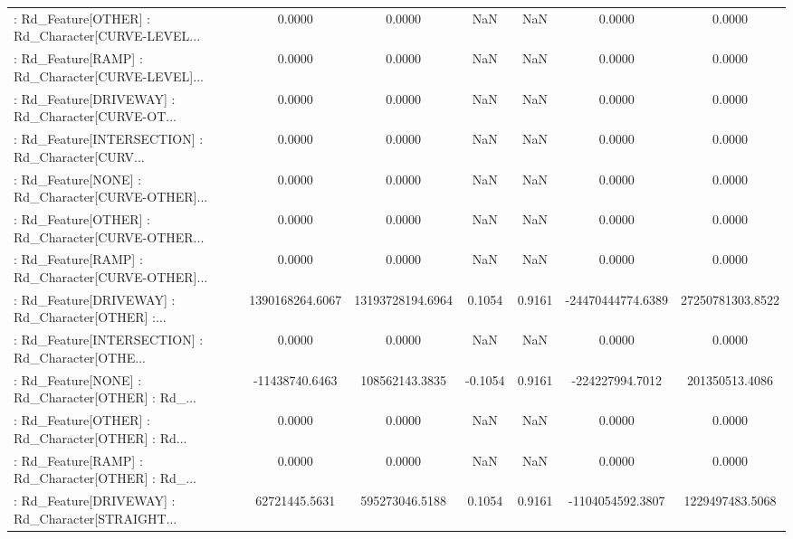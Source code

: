 \begin{longtable}{p{4cm}cccccc}
 : Rd\_Feature[OTHER] : Rd\_Character[CURVE-LEVEL... &            0.0000 &            0.0000 &     NaN &          NaN &             0.0000 &            0.0000 \\
 : Rd\_Feature[RAMP] : Rd\_Character[CURVE-LEVEL]... &            0.0000 &            0.0000 &     NaN &          NaN &             0.0000 &            0.0000 \\
 : Rd\_Feature[DRIVEWAY] : Rd\_Character[CURVE-OT... &            0.0000 &            0.0000 &     NaN &          NaN &             0.0000 &            0.0000 \\
 : Rd\_Feature[INTERSECTION] : Rd\_Character[CURV... &            0.0000 &            0.0000 &     NaN &          NaN &             0.0000 &            0.0000 \\
 : Rd\_Feature[NONE] : Rd\_Character[CURVE-OTHER]... &            0.0000 &            0.0000 &     NaN &          NaN &             0.0000 &            0.0000 \\
 : Rd\_Feature[OTHER] : Rd\_Character[CURVE-OTHER... &            0.0000 &            0.0000 &     NaN &          NaN &             0.0000 &            0.0000 \\
 : Rd\_Feature[RAMP] : Rd\_Character[CURVE-OTHER]... &            0.0000 &            0.0000 &     NaN &          NaN &             0.0000 &            0.0000 \\
 : Rd\_Feature[DRIVEWAY] : Rd\_Character[OTHER] :... &   1390168264.6067 &  13193728194.6964 &  0.1054 &       0.9161 &  -24470444774.6389 &  27250781303.8522 \\
 : Rd\_Feature[INTERSECTION] : Rd\_Character[OTHE... &            0.0000 &            0.0000 &     NaN &          NaN &             0.0000 &            0.0000 \\
 : Rd\_Feature[NONE] : Rd\_Character[OTHER] : Rd\_... &    -11438740.6463 &    108562143.3835 & -0.1054 &       0.9161 &    -224227994.7012 &    201350513.4086 \\
 : Rd\_Feature[OTHER] : Rd\_Character[OTHER] : Rd... &            0.0000 &            0.0000 &     NaN &          NaN &             0.0000 &            0.0000 \\
 : Rd\_Feature[RAMP] : Rd\_Character[OTHER] : Rd\_... &            0.0000 &            0.0000 &     NaN &          NaN &             0.0000 &            0.0000 \\
 : Rd\_Feature[DRIVEWAY] : Rd\_Character[STRAIGHT... &     62721445.5631 &    595273046.5188 &  0.1054 &       0.9161 &   -1104054592.3807 &   1229497483.5068 \\

\end{longtable}
